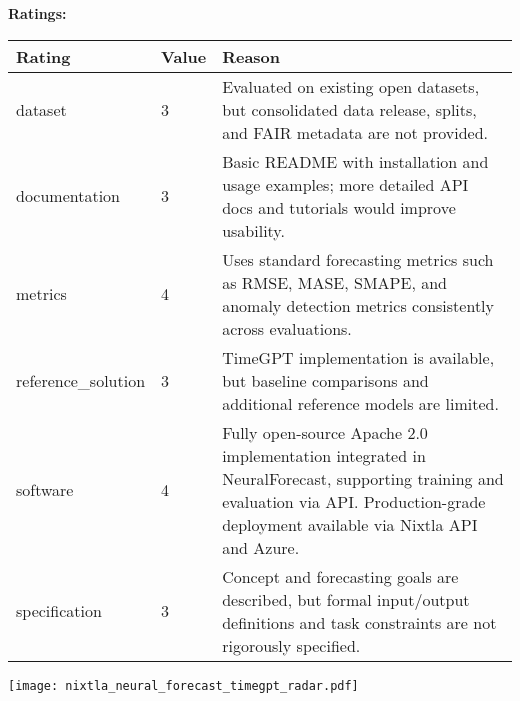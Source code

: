 {{{\bf Ratings:} ~ \\

\begin{tabular}{p{} p{} p{}}
\hline
Rating & Value & Reason \\
\hline
dataset & 3 & Evaluated on existing open datasets, but consolidated data release, splits, and FAIR
metadata are not provided.
 \\
documentation & 3 & Basic README with installation and usage examples; more detailed API docs and tutorials
would improve usability.
 \\
metrics & 4 & Uses standard forecasting metrics such as RMSE, MASE, SMAPE, and anomaly detection
metrics consistently across evaluations.
 \\
reference\_solution & 3 & TimeGPT implementation is available, but baseline comparisons and additional reference
models are limited.
 \\
software & 4 & Fully open-source Apache 2.0 implementation integrated in NeuralForecast,
supporting training and evaluation via API. Production-grade deployment available via Nixtla API and Azure.
 \\
specification & 3 & Concept and forecasting goals are described, but formal input/output definitions
and task constraints are not rigorously specified.
 \\
\hline
\end{tabular}

\texttt{[image: nixtla\_neural\_forecast\_timegpt\_radar.pdf]}
}}
\clearpage